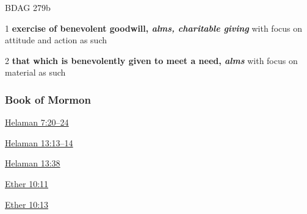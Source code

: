 				\begin{compactdesc}
				
					\item[BDAG 279b] \textbf{}
						\begin{compactitem}
							\item[1] \textbf{exercise of benevolent goodwill, \textit{alms, charitable giving}} with focus on attitude and action as such
							\item[2] \textbf{that which is benevolently given to meet a need, \textit{alms}} with focus on material as such
						\end{compactitem}
						
						
						
						
				\end{compactdesc}
		
	\subsubsection{Book of Mormon} %
		\label{RIGHTEOUSNESS-BOM}
	
		
		\begin{compactdesc}
			\item[{\hyperref[HELAMAN-7-20]{Helaman 7:20--24}}]
			\item[{\hyperref[HELAMAN-13-13]{Helaman 13:13--14}}]
			\item[{\hyperref[HELAMAN-13-38]{Helaman 13:38}}]
			\item[{\hyperref[ETHER-10-11]{Ether 10:11}}]
			\item[{\hyperref[ETHER-10-13]{Ether 10:13}}]
		\end{compactdesc}
		
